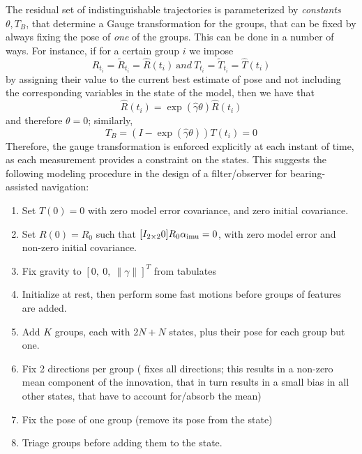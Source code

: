 The residual set of indistinguishable trajectories is parameterized by {\em constants} $\theta, T_B$, that determine a Gauge transformation for the groups, that can be fixed by always fixing the pose of {\em one} of the groups. This can be done in a number of ways. For instance, if for a certain group $i$ we impose
\begin{equation}
R_{t_i}  = \tilde R_{t_i} = \hat R(t_i) \ {\mathrm and} \ T_{t_i}  = \tilde T_{t_i} = \hat T(t_i)
\end{equation}
by assigning their value to the current best estimate of pose and not including the corresponding variables in the state of the model, then we have that
\begin{equation}
\hat R(t_i) = \exp(\widehat \gamma \theta) \hat R(t_i) 
\end{equation}
and therefore $\theta = 0$; similarly, 
\begin{equation}
T_B = (I - \exp(\widehat \gamma \theta))T(t_i) = 0
\end{equation}
 Therefore, the gauge transformation is enforced explicitly at each instant of time, as each measurement provides a constraint on the states. This suggests the following modeling procedure in the design of a filter/observer for bearing-assisted navigation:
\begin{enumerate}
\item Set $T(0) = 0$ with zero model error covariance, and zero initial covariance.
\item Set $R(0) = R_0$ such that $[I_{2\times 2} 0]R_0 \alpha_\mathrm{imu}  = 0$, with zero model error and non-zero initial covariance.
\item Fix gravity to $[0, \ 0, \ \| \gamma \|]^T$ from tabulates
\item Initialize at rest, then perform some fast motions before groups of features are added.
\item Add $K$ groups, each with $2N + N$ states, plus their pose for each group but one. 
\item Fix 2 directions per group (\cite{jonesS09} fixes all directions; this results in a non-zero mean component of the innovation, that in turn results in a small bias in all other states, that have to account for/absorb the mean)
\item Fix the pose of one group (remove its pose from the state)
\item Triage groups before adding them to the state. 
\end{enumerate}
